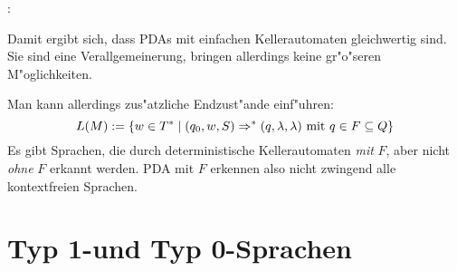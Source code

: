 \remark:{
  Damit ergibt sich, dass PDAs mit einfachen Kellerautomaten 
  gleichwertig sind. Sie sind eine Verallgemeinerung, bringen allerdings
  keine gr"o"seren M"oglichkeiten.

  Man kann allerdings zus"atzliche Endzust"ande einf"uhren:
  \[L(M) := \{w \in T^* \mid (q_0,w,S) \Rightarrow^* (q, \lambda,\lambda) 
    \text{ mit } q\in F\subseteq Q\}
    \]
  Es gibt Sprachen, die durch deterministische
  Kellerautomaten \emph{mit} $F$, aber nicht \emph{ohne} $F$ erkannt
  werden. PDA mit $F$ erkennen also nicht zwingend alle kontextfreien Sprachen.
  }
\section{Typ 1-und Typ 0-Sprachen}
